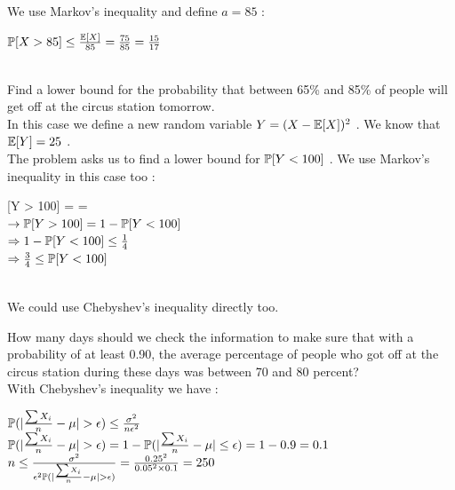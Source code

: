 \documentclass[30pt]{article}
\begin{document}
We use Markov's inequality and define $a = 85$ : \\
\begin{center}
    $\Bbb{P}[X > 85] \le \frac{\Bbb{E}[X]}{85} = \frac{75}{85} = \frac{15}{17} $
\end{center} \\

{\color{blue}{\large  2.} Find a lower bound for the probability that between 65\% and 85\% of people will get off at the circus station tomorrow. } \\


In this case we define a new random variable $Y = (X - \Bbb{E}[X])^2 $ . We know that $\Bbb{E}[Y] = 25 $ .\\
The problem asks us to find a lower bound for $\Bbb{P}[Y < 100] $ . We use Markov's inequality in this case too : \\

\begin{center}
    [Y > 100] \le {} =  =  \vspace{0.25cm}\\
    $\rightarrow \Bbb{P}[Y > 100] = 1 - \Bbb{P}[Y < 100] $ \vspace{0.25cm}\\
    $\Rightarrow 1 - \Bbb{P}[Y < 100]  \le \frac{1}{4} $ \vspace{0.25cm}\\
    $\Rightarrow \frac{3}{4} \le \Bbb{P}[Y < 100] $
\end{center} \\
We could use Chebyshev's inequality directly too. 

\newpage
{\color{blue}{\large  3.} How many days should we check the information to make sure that with a probability of at least 0.90, the average percentage of people who got off at the circus station during these days was between 70 and 80 percent? } \\
With Chebyshev's inequality we have : \\
\begin{center}
    $\Bbb{P}(|\frac{\sum X_i}{n} - \mu | > \epsilon) \le \frac{\sigma^2}{n\epsilon^2} $ \vspace{0.25cm} \\
    $\Bbb{P}(|\frac{\sum X_i}{n} - \mu | > \epsilon) = 1 - \Bbb{P}(|\frac{\sum X_i}{n} - \mu | \le \epsilon) = 1 - 0.9 = 0.1 $ \vspace{0.25cm} \\
    $n \le \frac{\sigma^2}{\epsilon^2 \Bbb{P}(|\frac{\sum X_i}{n} - \mu | > \epsilon)} = \frac{0.25^2}{0.05^2 \times 0.1} = 250 $
\end{center}
\end{document}
